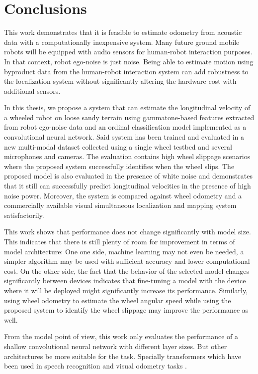 \section{Conclusions} \label{chap:conclusions}

This work demonstrates that it is feasible to estimate odometry from acoustic
data with a computationally inexpensive system. Many future ground mobile
robots will be equipped with audio sensors for human-robot interaction
purposes. In that context, robot ego-noise is just noise. Being able to
estimate motion using byproduct data from the human-robot interaction system
can add robustness to the localization system without significantly altering
the hardware cost with additional sensors.

In this thesis, we propose a system that can estimate the longitudinal velocity
of a wheeled robot on loose sandy terrain using gammatone-based features
extracted from robot ego-noise data and an ordinal classification model
implemented as a convolutional neural network. Said system has been trained and
evaluated in a new multi-modal dataset collected using a single wheel testbed
and several microphones and cameras. The evaluation contains high wheel
slippage scenarios where the proposed system successfully identifies when the
wheel slips. The proposed model is also evaluated in the presence of white
noise and demonstrates that it still can successfully predict longitudinal
velocities in the presence of high noise power. Moreover, the system is
compared against wheel odometry and a commercially available visual
simultaneous localization and mapping system satisfactorily.

This work shows that performance does not change significantly with model size.
This indicates that there is still plenty of room for improvement in terms of
model architecture: One one side, machine learning may not even be needed, a
simpler algorithm may be used with sufficient accuracy and lower computational
cost. On the other side, the fact that the behavior of the selected model
changes significantly between devices indicates that fine-tuning \cite{TL2016}
a model with the device where it will be deployed might significantly increase
its performance. Similarly, using wheel odometry to estimate the wheel angular
speed while using the proposed system to identify the wheel slippage may
improve the performance as well.

From the model point of view, this work only evaluates the performance of a
shallow convolutional neural network with different layer sizes. But other
architectures be more suitable for the task. Specially transformers
\cite{vaswani2017attention} which have been used in speech recognition
\cite{kim2022squeezeformer} and visual odometry tasks \cite{li2020transformer}.

